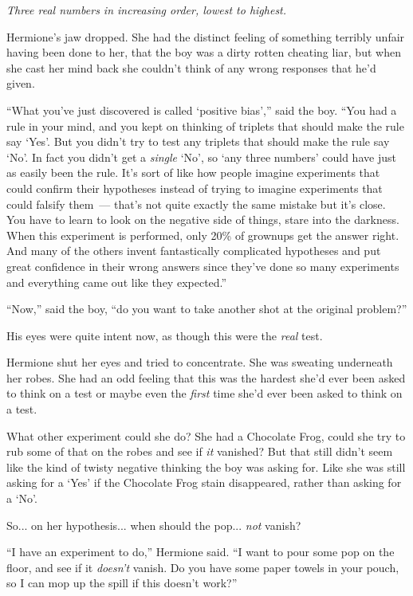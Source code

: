 \emph{Three real numbers in increasing order, lowest to highest.}

Hermione's jaw dropped. She had the distinct feeling of something terribly unfair having been done to her, that the boy was a dirty rotten cheating liar, but when she cast her mind back she couldn't think of any wrong responses that he'd given.

``What you've just discovered is called `positive bias','' said the boy. ``You had a rule in your mind, and you kept on thinking of triplets that should make the rule say `Yes'. But you didn't try to test any triplets that should make the rule say `No'. In fact you didn't get a \emph{single} `No', so `any three numbers' could have just as easily been the rule. It's sort of like how people imagine experiments that could confirm their hypotheses instead of trying to imagine experiments that could falsify them~--- that's not quite exactly the same mistake but it's close. You have to learn to look on the negative side of things, stare into the darkness. When this experiment is performed, only 20\% of grownups get the answer right. And many of the others invent fantastically complicated hypotheses and put great confidence in their wrong answers since they've done so many experiments and everything came out like they expected.''

``Now,'' said the boy, ``do you want to take another shot at the original problem?''

His eyes were quite intent now, as though this were the \emph{real} test.

Hermione shut her eyes and tried to concentrate. She was sweating underneath her robes. She had an odd feeling that this was the hardest she'd ever been asked to think on a test or maybe even the \emph{first} time she'd ever been asked to think on a test.

What other experiment could she do? She had a Chocolate Frog, could she try to rub some of that on the robes and see if \emph{it} vanished? But that still didn't seem like the kind of twisty negative thinking the boy was asking for. Like she was still asking for a `Yes' if the Chocolate Frog stain disappeared, rather than asking for a `No'.

So... on her hypothesis... when should the pop... \emph{not} vanish?

``I have an experiment to do,'' Hermione said. ``I want to pour some pop on the floor, and see if it \emph{doesn't} vanish. Do you have some paper towels in your pouch, so I can mop up the spill if this doesn't work?''

